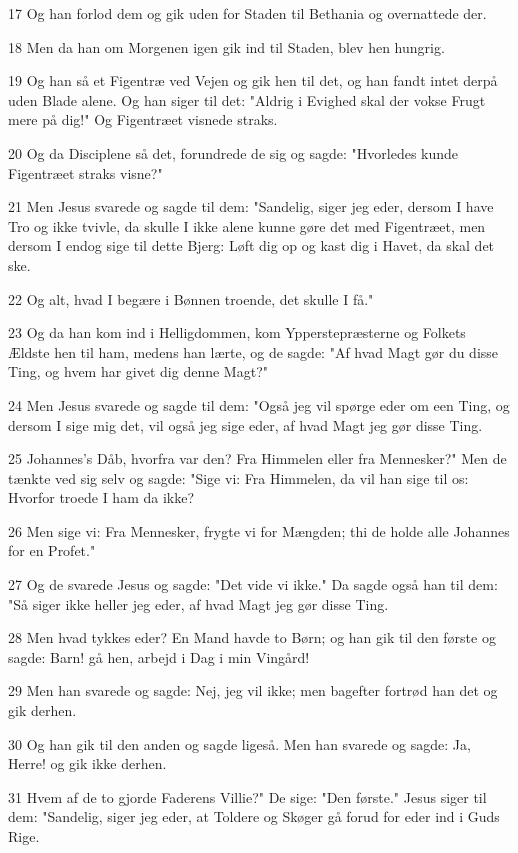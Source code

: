 \par 17 Og han forlod dem og gik uden for Staden til Bethania og overnattede der.
\par 18 Men da han om Morgenen igen gik ind til Staden, blev hen hungrig.
\par 19 Og han så et Figentræ ved Vejen og gik hen til det, og han fandt intet derpå uden Blade alene. Og han siger til det: "Aldrig i Evighed skal der vokse Frugt mere på dig!" Og Figentræet visnede straks.
\par 20 Og da Disciplene så det, forundrede de sig og sagde: "Hvorledes kunde Figentræet straks visne?"
\par 21 Men Jesus svarede og sagde til dem: "Sandelig, siger jeg eder, dersom I have Tro og ikke tvivle, da skulle I ikke alene kunne gøre det med Figentræet, men dersom I endog sige til dette Bjerg: Løft dig op og kast dig i Havet, da skal det ske.
\par 22 Og alt, hvad I begære i Bønnen troende, det skulle I få."
\par 23 Og da han kom ind i Helligdommen, kom Ypperstepræsterne og Folkets Ældste hen til ham, medens han lærte, og de sagde: "Af hvad Magt gør du disse Ting, og hvem har givet dig denne Magt?"
\par 24 Men Jesus svarede og sagde til dem: "Også jeg vil spørge eder om een Ting, og dersom I sige mig det, vil også jeg sige eder, af hvad Magt jeg gør disse Ting.
\par 25 Johannes's Dåb, hvorfra var den? Fra Himmelen eller fra Mennesker?" Men de tænkte ved sig selv og sagde: "Sige vi: Fra Himmelen, da vil han sige til os: Hvorfor troede I ham da ikke?
\par 26 Men sige vi: Fra Mennesker, frygte vi for Mængden; thi de holde alle Johannes for en Profet."
\par 27 Og de svarede Jesus og sagde: "Det vide vi ikke." Da sagde også han til dem: "Så siger ikke heller jeg eder, af hvad Magt jeg gør disse Ting.
\par 28 Men hvad tykkes eder? En Mand havde to Børn; og han gik til den første og sagde: Barn! gå hen, arbejd i Dag i min Vingård!
\par 29 Men han svarede og sagde: Nej, jeg vil ikke; men bagefter fortrød han det og gik derhen.
\par 30 Og han gik til den anden og sagde ligeså. Men han svarede og sagde: Ja, Herre! og gik ikke derhen.
\par 31 Hvem af de to gjorde Faderens Villie?" De sige: "Den første." Jesus siger til dem: "Sandelig, siger jeg eder, at Toldere og Skøger gå forud for eder ind i Guds Rige.
